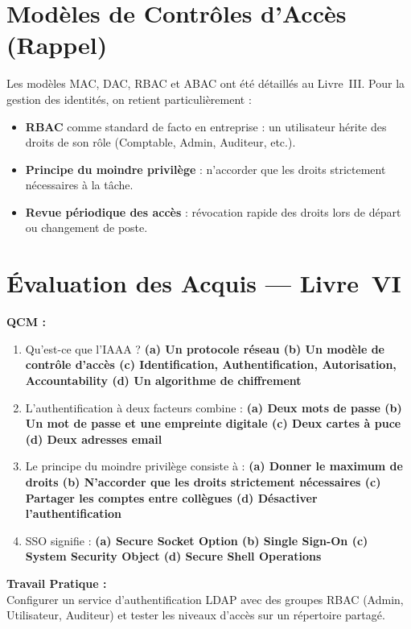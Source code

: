 \section{Modèles de Contrôles d'Accès (Rappel)}

Les modèles MAC, DAC, RBAC et ABAC ont été détaillés au Livre~III. Pour la gestion des identités, on retient particulièrement :
\begin{itemize}
    \item \textbf{RBAC} comme standard de facto en entreprise : un utilisateur hérite des droits de son rôle (Comptable, Admin, Auditeur, etc.).
    \item \textbf{Principe du moindre privilège} : n'accorder que les droits strictement nécessaires à la tâche.
    \item \textbf{Revue périodique des accès} : révocation rapide des droits lors de départ ou changement de poste.
\end{itemize}

\section{Évaluation des Acquis --- Livre~VI}

\begin{boxexo}
\textbf{QCM :}
\begin{enumerate}
    \item Qu'est-ce que l'IAAA ? \textbf{(a) Un protocole réseau \quad (b) Un modèle de contrôle d'accès \quad (c) Identification, Authentification, Autorisation, Accountability \quad (d) Un algorithme de chiffrement}
    \item L'authentification à deux facteurs combine : \textbf{(a) Deux mots de passe \quad (b) Un mot de passe et une empreinte digitale \quad (c) Deux cartes à puce \quad (d) Deux adresses email}
    \item Le principe du moindre privilège consiste à : \textbf{(a) Donner le maximum de droits \quad (b) N'accorder que les droits strictement nécessaires \quad (c) Partager les comptes entre collègues \quad (d) Désactiver l'authentification}
    \item SSO signifie : \textbf{(a) Secure Socket Option \quad (b) Single Sign-On \quad (c) System Security Object \quad (d) Secure Shell Operations}
\end{enumerate}

\textbf{Travail Pratique :}\\
Configurer un service d'authentification LDAP avec des groupes RBAC (Admin, Utilisateur, Auditeur) et tester les niveaux d'accès sur un répertoire partagé.
\end{boxexo}
